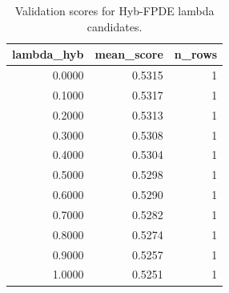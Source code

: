 \begin{table}[t]
\caption{Validation scores for Hyb-FPDE lambda candidates.}
\label{tab:lambda_distribution_computed}
\centering
\begin{tabular}{rrr}
\toprule
lambda\_hyb & mean\_score & n\_rows \\
\midrule
0.0000 & 0.5315 & 1 \\
0.1000 & 0.5317 & 1 \\
0.2000 & 0.5313 & 1 \\
0.3000 & 0.5308 & 1 \\
0.4000 & 0.5304 & 1 \\
0.5000 & 0.5298 & 1 \\
0.6000 & 0.5290 & 1 \\
0.7000 & 0.5282 & 1 \\
0.8000 & 0.5274 & 1 \\
0.9000 & 0.5257 & 1 \\
1.0000 & 0.5251 & 1 \\
\bottomrule
\end{tabular}

\end{table}

